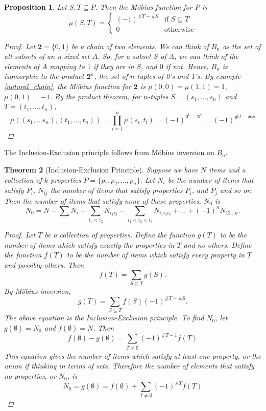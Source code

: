 \documentclass[psamsfonts]{amsart}
\newtheorem{thm}{Theorem}[section]
\newtheorem{prop}[thm]{Proposition}
\theoremstyle{definition}
\theoremstyle{remark}
\numberwithin{equation}{section}
\begin{document}
\begin{prop}\label{mobius_bl}
Let $S,T\subseteq P$. Then the M\"{o}bius function for $P$ is 
\begin{equation}
\mu(S,T) = 
\begin{cases}
(-1)^{\#T-\#S} & \text{if } S\subseteq T\\
0 & \text{otherwise}
\end{cases}
\end{equation}
\begin{proof}
Let $\mathbf{2}=\{0,1\}$ be a chain of two elements. We can think of $B_n$ as the set of all subsets of an n-sized set $A$. So, for a subset $S$ of $A$, we can think of the elements of $A$ mapping to $1$ if they are in $S$, and $0$ if not. Hence, $B_n$ is isomorphic to the product $\mathbf{2}^n$, the set of $n$-tuples of 0's and 1's. By example \ref{natural_chain}, the M\"{o}bius function for $\mathbf{2}$ is $\mu(0,0)=\mu(1,1)=1$, $\mu(0,1)=-1$. By the product theorem, for $n$-tuples $S=(s_1,...,s_n)$ and $T=(t_1,...,t_n)$, 
\[
\mu((s_1,...s_n),(t_1,...,t_n))=\displaystyle\prod^n_{i=1}\mu(s_i,t_i)=(-1)^{\mathbf{2}^{t_i}-\mathbf{2}^{s_i}}=(-1)^{\#T-\#S}
\]
\end{proof}
\end{prop}
The Inclusion-Exclusion principle follows from  M\"{o}bius inversion on $B_n$. 
\begin{thm}[Inclusion-Exclusion Principle]
Suppose we have $N$ items and a collection of $k$ properties $P=\{p_1,p_2,\dots, p_n\}$. Let $N_i$ be the number of items that satisfy $P_i$, $N_{ij}$ the number of items that satisfy properties $P_i$, and $P_j$ and so on. Then the number of items that satisfy none of these properties, $N_0$ is
\begin{equation*}
    N_0= N - \sum N_i+\sum_{i_1<i_2}N_{i_1i_2}-\sum_{i_1<i_2<i_3}N_{i_1i_2i_3}+\dots + (-1)^nN_{12\dots n}.
\end{equation*}
\begin{proof}
Let $T$ be a collection of properties. Define the function $g(T)$ to be the number of items which satisfy exactly the properties in $T$ and no others. Define the function $f(T)$ to be the number of items which satisfy every property in $T$ and possibly others. Then  
\[
f(T)=\sum_{S\subseteq T}g(S).
\]
By M\"{o}bius inversion, 
\[
g(T)=\sum_{S\subseteq T}f(S)(-1)^{\#T-\#S}.
\]
The above equation is the Inclusion-Exclusion principle. To find $N_0$, let $g(\emptyset)=N_0$ and $f(\emptyset)=N$. Then 
\begin{equation*}
    f(\emptyset)-g(\emptyset) = \sum_{T\neq \emptyset}(-1)^{\#T-1}f(T)
\end{equation*}
This equation gives the number of items which satisfy at least one property, or  the union if thinking in terms of sets. Therefore the number of elements that satisfy no properties, or $N_0$, is
\begin{equation*}
    N_0=g(\emptyset)=f(\emptyset)+\sum_{T\neq \emptyset}(-1)^{\#T}f(T)
\end{equation*}
\end{proof}
\end{thm}
\end{document}
